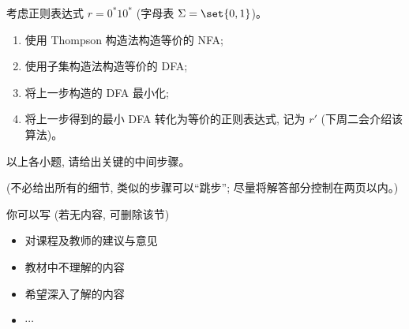 \documentclass[a4paper, justified]{tufte-handout}
\begin{document}
\begin{problem}[正则表达式与自动机 \score{10 = 2 + 2 + 2 + 2 + 2}]
  考虑正则表达式 $r = 0^{\ast}10^{\ast}$ (字母表 $\Sigma = \set{0, 1}$)。
  \begin{enumerate}[(1)]
    \item 使用 Thompson 构造法构造等价的 NFA;
    \item 使用子集构造法构造等价的 DFA;
    \item 将上一步构造的 DFA 最小化;
    \item 将上一步得到的最小 DFA 转化为等价的正则表达式, 记为 $r'$ (下周二会介绍该算法)。
  \end{enumerate}
  以上各小题, 请给出关键的中间步骤。

  \noindent (不必给出所有的细节, 类似的步骤可以``跳步''; 尽量将解答部分控制在两页以内。)

\end{problem}

\begin{solution}
\end{solution}



\beginfb

你可以写 (若无内容, 可删除该节)
\begin{itemize}
  \item 对课程及教师的建议与意见
  \item 教材中不理解的内容
  \item 希望深入了解的内容
  \item $\cdots$
\end{itemize}
\end{document}
